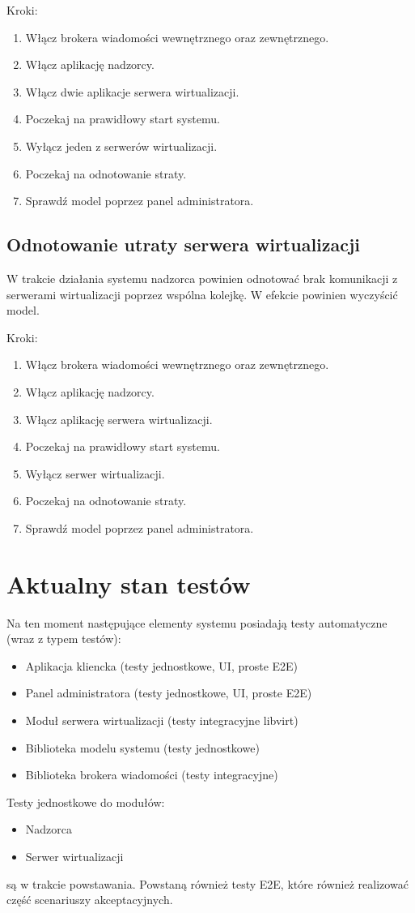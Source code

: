 \documentclass[12pt]{article}
\begin{document}
Kroki:
\begin{enumerate}
	\item Włącz brokera wiadomości wewnętrznego oraz zewnętrznego.
	\item Włącz aplikację nadzorcy.
	\item Włącz dwie aplikacje serwera wirtualizacji.
	\item Poczekaj na prawidłowy start systemu.
	\item Wyłącz jeden z serwerów wirtualizacji.
	\item Poczekaj na odnotowanie straty.
	\item Sprawdź model poprzez panel administratora.
\end{enumerate}

\subsection {Odnotowanie utraty serwera wirtualizacji}
W trakcie działania systemu nadzorca powinien odnotować brak komunikacji z serwerami wirtualizacji poprzez wspólna kolejkę.
W efekcie powinien wyczyścić model.

Kroki:
\begin{enumerate}
	\item Włącz brokera wiadomości wewnętrznego oraz zewnętrznego.
	\item Włącz aplikację nadzorcy.
	\item Włącz aplikację serwera wirtualizacji.
	\item Poczekaj na prawidłowy start systemu.
	\item Wyłącz serwer wirtualizacji.
	\item Poczekaj na odnotowanie straty.
	\item Sprawdź model poprzez panel administratora.
\end{enumerate}

\section{Aktualny stan testów}
Na ten moment następujące elementy systemu posiadają testy automatyczne (wraz z typem testów):
\begin{itemize}
	\item Aplikacja kliencka (testy jednostkowe, UI, proste E2E)
	\item Panel administratora (testy jednostkowe, UI, proste E2E)
	\item Moduł serwera wirtualizacji (testy integracyjne libvirt)
	\item Biblioteka modelu systemu (testy jednostkowe)
	\item Biblioteka brokera wiadomości (testy integracyjne)
\end{itemize}
Testy jednostkowe do modułów:
\begin{itemize}
	\item Nadzorca
	\item Serwer wirtualizacji
\end{itemize}
są w trakcie powstawania.
Powstaną również testy E2E, które również realizować część scenariuszy akceptacyjnych.
\end{document}

